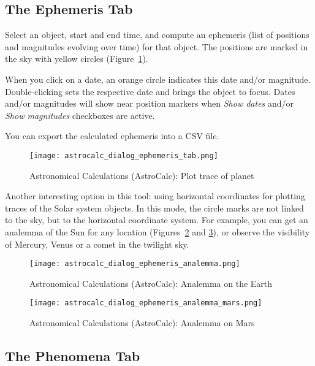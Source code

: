 \subsection{The Ephemeris Tab}
\label{sec:gui:AstroCalc:Ephemeris}

Select an object, start and end time, and compute an ephemeris (list of positions and magnitudes evolving over time) for that object. 
The positions are marked in the sky with yellow circles (Figure~\ref{fig:gui:AstroCalc:Ephemeris}). 

When you click on a date, an orange circle indicates this date and/or magnitude. 
Double-clicking sets the respective date and brings the object to focus. 
Dates and/or magnitudes will show near position markers when \emph{Show dates} and/or \emph{Show magnitudes} checkboxes are active.

You can export the calculated ephemeris into a CSV file. 

\begin{figure}[tbp]
\centering\texttt{[image: astrocalc\_dialog\_ephemeris\_tab.png]}
\caption{Astronomical Calculations (AstroCalc): Plot trace of planet}
\label{fig:gui:AstroCalc:Ephemeris}
\end{figure}

Another interesting option in this tool: using horizontal coordinates for plotting traces of the Solar system objects. 
In this mode, the circle marks are not linked to the sky, but to the horizontal coordinate system.
For example, you can get an analemma of the Sun for any location (Figures~\ref{fig:gui:AstroCalc:Ephemeris:Analemma} and \ref{fig:gui:AstroCalc:Ephemeris:AnalemmaMars}), 
or observe the visibility of Mercury, Venus or a comet in the twilight sky.

\begin{figure}[tbp]
\centering\texttt{[image: astrocalc\_dialog\_ephemeris\_analemma.png]}
\caption{Astronomical Calculations (AstroCalc): Analemma on the Earth}
\label{fig:gui:AstroCalc:Ephemeris:Analemma}
\end{figure}

\begin{figure}[tbp]
\centering\texttt{[image: astrocalc\_dialog\_ephemeris\_analemma\_mars.png]}
\caption{Astronomical Calculations (AstroCalc): Analemma on Mars}
\label{fig:gui:AstroCalc:Ephemeris:AnalemmaMars}
\end{figure}

\newpage
\subsection{The Phenomena Tab}
\label{sec:gui:AstroCalc:Phenomena}


